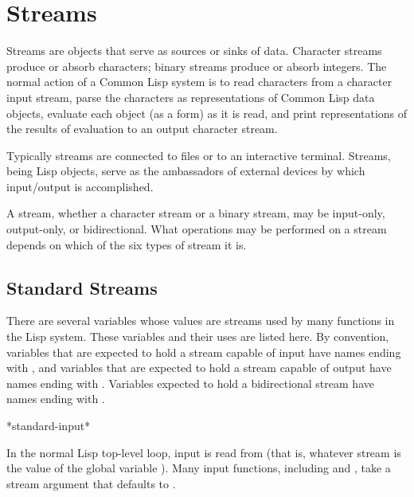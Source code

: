 
\clearpage\def\pagestatus{FINAL PROOF}

\chapter{Streams}
\label{STREAM}

Streams are objects that serve as sources or sinks of data.
Character streams produce or absorb characters;
binary streams produce or absorb integers.
The normal action of a Common Lisp system is to read characters from
a character input stream, parse the characters as representations
of Common Lisp data objects, evaluate each object (as a form) as it is read, and
print representations of the results of
evaluation to an output character stream.

Typically streams are connected to files or to an interactive terminal.
Streams, being Lisp objects, serve as the ambassadors of external
devices by which input/output is accomplished.

A stream, whether a character stream or a binary
stream, may be input-only, output-only, or bidirectional.
What operations may be performed on a stream depends on which of
the six types of stream it is.

\section {Standard Streams}

There are several variables whose values are streams used by many
functions in the Lisp system.  These variables and their uses are
listed here.  By convention, variables that are expected to hold a
stream capable of input have names ending with , and
variables that are expected to hold a
stream capable of output have names ending with .
Variables expected to hold a
bidirectional stream have names ending with .

\begin{defun}[Variable]
*standard-input*

In the normal Lisp top-level loop, input is read from
 (that is, whatever stream is the value of the global
variable ).  Many input functions, including
 and , take a stream argument that defaults to
.
\end{defun}

